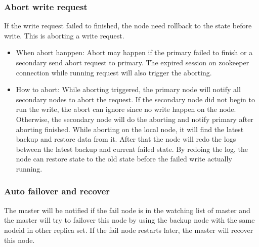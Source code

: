 \subsubsection{Abort write request}
If the write request failed to finished, the node need rollback to the state before write. This is aborting a write request.
\begin{itemize}
\item When abort hanppen: Abort may happen if the primary failed to finish or a secondary send abort request to primary. The expired session on zookeeper connection while running request will also trigger the aborting. 
\item How to abort: While aborting triggered, the primary node will notify all secondary nodes to abort the request. If the secondary node did not begin to run the write, the abort can ignore since no write happen on the node. Otherwise, the secondary node will do the aborting and notify primary after aborting finished. While aborting on the local node, it will find the latest backup and restore data from it. After that the node will redo the logs between the latest backup and current failed state. By redoing the log, the node can restore state to the old state before the failed write actually running.
\end{itemize}
\subsubsection{Auto failover and recover}
The master will be notified if the fail node is in the watching list of master and the master will try to failover this node by using the backup node with the same nodeid in other replica set. If the fail node restarts later, the master will recover this node.

